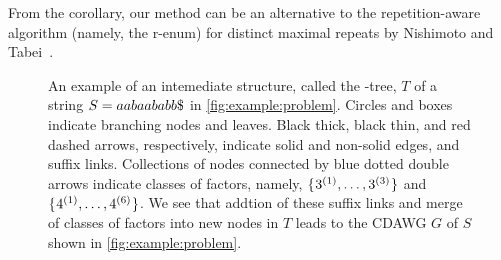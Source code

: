 


From the corollary, our method can be an alternative to the repetition-aware algorithm (namely, the r-enum) for distinct maximal repeats by Nishimoto and Tabei~\cite{nishimoto:cpm2021enum}.



\begin{figure}[t]
\centering
\begin{minipage}[c]{0.42\textwidth}
\centering
{}
\end{minipage}
\caption{An example of an intemediate structure, called the \LPTrm-tree, $T$ of a string $S = aabaababb\daller$ in \cref{fig:example:problem}.
Circles and boxes indicate branching nodes and leaves. Black thick, black thin, and red dashed arrows, respectively, indicate solid and non-solid edges, and suffix links.
Collections of nodes connected by blue dotted double arrows indicate
classes of factors, namely, $\{\kern0.05em3^{(1)}, \dots, 3^{(3)}\kern0.05em\}$ and $\{\kern0.05em4^{(1)}, \dots, 4^{(6)}\kern0.05em\}$. 
We see that addtion of these suffix links and merge of classes of factors into new nodes in $T$ leads to the CDAWG $G$ of $S$ shown in \cref{fig:example:problem}. 
}\label{fig:example:lpttree}
\end{figure}

